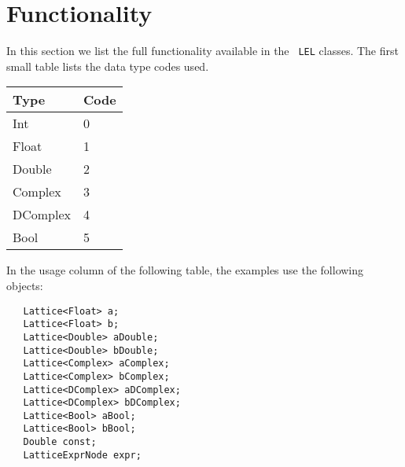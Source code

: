\section {Functionality}

In this section we list the full functionality available in the {\tt
LEL} classes.  The first small table lists the data type codes used. 

\begin{center}
\begin{tabular}{|l|l}
\hline
Type & Code \\
\hline
Int        & 0 \\
Float      & 1 \\
Double     & 2 \\
Complex    & 3 \\
DComplex   & 4 \\
Bool       & 5 \\
\hline
\end{tabular}
\end{center}

  
In the usage column of the following table, the examples use
the following objects:

\begin{verbatim}
   Lattice<Float> a;
   Lattice<Float> b;
   Lattice<Double> aDouble;
   Lattice<Double> bDouble;
   Lattice<Complex> aComplex;
   Lattice<Complex> bComplex;
   Lattice<DComplex> aDComplex;
   Lattice<DComplex> bDComplex;
   Lattice<Bool> aBool;
   Lattice<Bool> bBool;
   Double const;
   LatticeExprNode expr; 
\end{verbatim}

